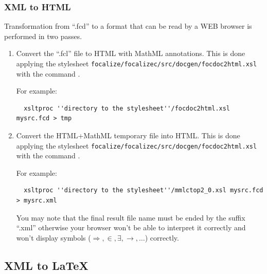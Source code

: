 \subsubsection{XML to HTML}
Transformation from ``.fcd'' to a format that can be read by a WEB
browser is performed in two passes.
\begin{enumerate}
  \item Convert the ``.fcl'' file to HTML with MathML annotations.
  This is done applying the stylesheet
  {\tt focalize/focalizec/src/docgen/focdoc2html.xsl} with the command
  \xsltproc.

  For example:
  {\scriptsize
  \begin{verbatim}
  xsltproc ''directory to the stylesheet''/focdoc2html.xsl mysrc.fcd > tmp
  \end{verbatim}
  }

  \item Convert the HTML+MathML temporary file into HTML.
  This is done applying the stylesheet
  {\tt focalize/focalizec/src/docgen/focdoc2html.xsl} with the command
  \xsltproc.

  For example:
  {\scriptsize
  \begin{verbatim}
  xsltproc ''directory to the stylesheet''/mmlctop2_0.xsl mysrc.fcd > mysrc.xml
  \end{verbatim}
  }
  You may note that the final result file name must be ended by the
  suffix ``.xml'' otherwise your browser won't be able to interpret it
  correctly and won't display symbols ($\Rightarrow, \in, \exists,
  \rightarrow, \ldots$) correctly.
\end{enumerate}

\subsection{XML to LaTeX}
